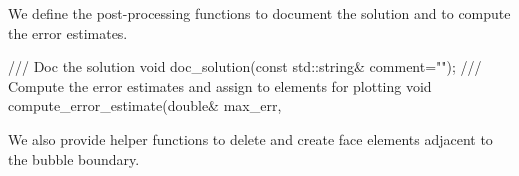 We define the post-\/processing functions to document the solution and to compute the error estimates.


\begin{DoxyCodeInclude}
 \textcolor{comment}{/// Doc the solution}
 \textcolor{keywordtype}{void} doc\_solution(\textcolor{keyword}{const} std::string& comment=\textcolor{stringliteral}{""});
 \textcolor{comment}{}
\textcolor{comment}{ /// Compute the error estimates and assign to elements for plotting}
\textcolor{comment}{} \textcolor{keywordtype}{void} compute\_error\_estimate(\textcolor{keywordtype}{double}& max\_err,

\end{DoxyCodeInclude}


We also provide helper functions to delete and create face elements adjacent to the bubble boundary.


